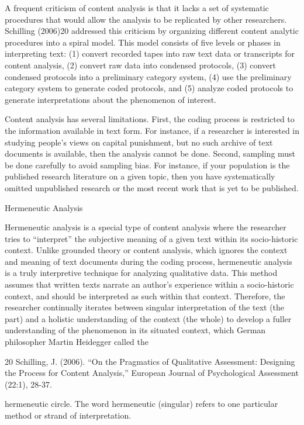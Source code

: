 A frequent criticism of content analysis is that it lacks a set of systematic procedures that would allow the analysis to be replicated by other researchers. Schilling (2006)20 addressed this criticism by organizing different content analytic procedures into a spiral model. This model consists of five levels or phases in interpreting text: (1) convert recorded tapes into raw text data or transcripts for content analysis, (2) convert raw data into condensed protocols, (3) convert condensed protocols into a preliminary category system, (4) use the preliminary category system to generate coded protocols, and (5) analyze coded protocols to generate interpretations about the phenomenon of interest.

Content analysis has several limitations. First, the coding process is restricted to the information available in text form. For instance, if a researcher is interested in studying people’s views on capital punishment, but no such archive of text documents is available, then the analysis cannot be done. Second, sampling must be done carefully to avoid sampling bias. For instance, if your population is the published research literature on a given topic, then you have systematically omitted unpublished research or the most recent work that is yet to be published.

Hermeneutic Analysis

Hermeneutic analysis is a special type of content analysis where the researcher tries to “interpret” the subjective meaning of a given text within its socio-historic context. Unlike grounded theory or content analysis, which ignores the context and meaning of text documents during the coding process, hermeneutic analysis is a truly interpretive technique for analyzing qualitative data. This method assumes that written texts narrate an author’s experience within a socio-historic context, and should be interpreted as such within that context. Therefore, the researcher continually iterates between singular interpretation of the text (the part) and a holistic understanding of the context (the whole) to develop a fuller understanding of the phenomenon in its situated context, which German philosopher Martin Heidegger called the 

20 Schilling, J. (2006). “On the Pragmatics of Qualitative Assessment: Designing the Process for Content Analysis,” European Journal of Psychological Assessment (22:1), 28-37.


hermeneutic circle. The word hermeneutic (singular) refers to one particular method or strand of interpretation.

